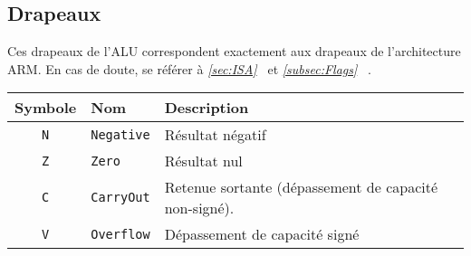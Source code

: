 \documentclass{article}
\begin{document}
    \subsection{Drapeaux}

    Ces drapeaux de l'ALU correspondent exactement aux drapeaux de l'architecture ARM. En cas de doute, se référer à \textit{\ref{sec:ISA}~} et \textit{\ref{subsec:Flags}~} .

    \begin{tabular}{|c|l|l|}
        \hline
        \textbf{Symbole} & \textbf{Nom}       & \textbf{Description}                                 \\
        \hline

        \texttt{N}      & \texttt{Negative} & Résultat négatif                                     \\
        \hline
        \texttt{Z}      & \texttt{Zero}    & Résultat nul                                         \\
        \hline
        \texttt{C}      & \texttt{CarryOut} & Retenue sortante (dépassement de capacité non-signé). \\
        \hline
        \texttt{V}      & \texttt{Overflow} & Dépassement de capacité signé                        \\

        \hline
    \end{tabular}
\end{document}

